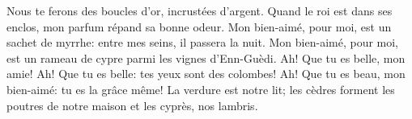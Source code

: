 Nous te ferons des boucles d’or, incrustées d’argent.
Quand le roi est dans ses enclos,
	mon parfum répand sa bonne odeur.
Mon bien-aimé, pour moi, est un sachet de myrrhe:
	entre mes seins, il passera la nuit.
Mon bien-aimé, pour moi, est un rameau de cypre
	parmi les vignes d’Enn-Guèdi.
Ah! Que tu es belle, mon amie! Ah! Que tu es belle:
	tes yeux sont des colombes!
Ah! Que tu es beau, mon bien-aimé: tu es la grâce même!
	La verdure est notre lit;
	les cèdres forment les poutres de notre maison et les cyprès, nos lambris.
